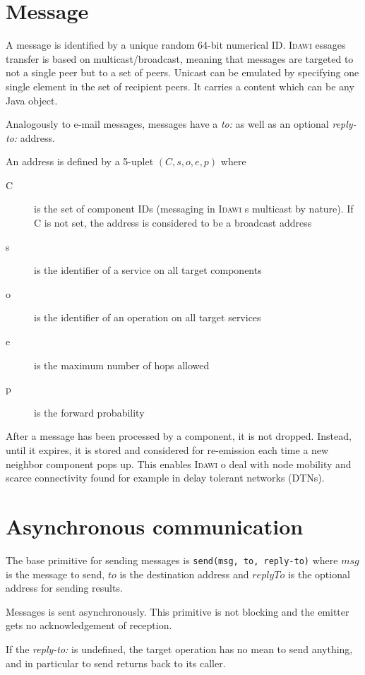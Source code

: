 \documentclass{article}
\newcommand{\idawi}[1]{\textsc{Idawi}\xspace}
\begin{document}
\section{Message}

A message is identified by a unique random 64-bit numerical ID.
\idawi messages transfer is based on multicast/broadcast, meaning that  messages are targeted to not a single peer but to a set of peers. Unicast can be emulated by specifying one single element in the set of recipient peers.  It carries a content which can be any Java object. 


Analogously to e-mail messages, messages have a {\em to:} as well as an optional {\em reply-to:} address.

An address is defined by a 5-uplet $(C, s, o, e, p)$ where
\begin{description}
\item[C] is the set of component IDs (messaging in \idawi is multicast by nature). If C is not set, the address is considered to be a broadcast address
\item[s] is the identifier of a service on all target components
\item[o] is the identifier of an operation on all target services
\item[e] is the maximum number of hops allowed
\item[p] is the forward probability
\end{description}

After a message has been processed by a component, it is not dropped. Instead, until it expires, it is stored and considered for re-emission each time a new neighbor component pops up. This enables \idawi to deal with node mobility and scarce connectivity found for example in delay tolerant networks (DTNs).


\section{Asynchronous communication}

The base primitive for sending messages is
\texttt{send(msg, to, reply-to)}
where $msg$ is the message to send, $to$ is the destination address and $replyTo$ is the optional address for sending results.

Messages is sent asynchronously. This primitive is not blocking and the emitter gets no acknowledgement of reception.

If the {\em reply-to:} is undefined, the target operation has no mean to send anything, and in particular to send returns back to its caller.
\end{document}

